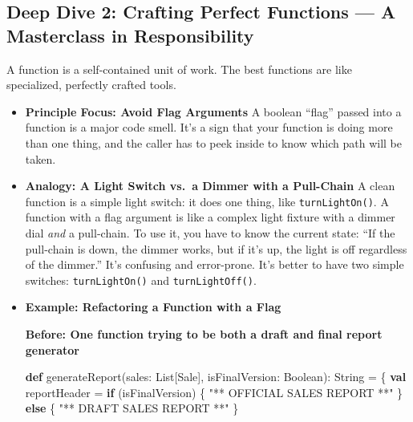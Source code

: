 \documentclass[
  letterpaper,
  DIV=11,
  numbers=noendperiod]{scrreprt}
\newenvironment{Shaded}{\begin{snugshade}}{\end{snugshade}}
\newcommand{\ControlFlowTok}[1]{\textcolor[rgb]{0.00,0.23,0.31}{\textbf{#1}}}
\newcommand{\ExtensionTok}[1]{\textcolor[rgb]{0.00,0.23,0.31}{#1}}
\newcommand{\FunctionTok}[1]{\textcolor[rgb]{0.28,0.35,0.67}{#1}}
\newcommand{\KeywordTok}[1]{\textcolor[rgb]{0.00,0.23,0.31}{\textbf{#1}}}
\newcommand{\NormalTok}[1]{\textcolor[rgb]{0.00,0.23,0.31}{#1}}
\newcommand{\OperatorTok}[1]{\textcolor[rgb]{0.37,0.37,0.37}{#1}}
\newcommand{\StringTok}[1]{\textcolor[rgb]{0.13,0.47,0.30}{#1}}
\begin{document}
\subsection{\texorpdfstring{\textbf{Deep Dive 2: Crafting Perfect
Functions --- A Masterclass in
Responsibility}}{Deep Dive 2: Crafting Perfect Functions --- A Masterclass in Responsibility}}\label{deep-dive-2-crafting-perfect-functions-a-masterclass-in-responsibility}

A function is a self-contained unit of work. The best functions are like
specialized, perfectly crafted tools.

\begin{itemize}
\item
  \textbf{Principle Focus: Avoid Flag Arguments} A boolean ``flag''
  passed into a function is a major code smell. It's a sign that your
  function is doing more than one thing, and the caller has to peek
  inside to know which path will be taken.
\item
  \textbf{Analogy: A Light Switch vs.~a Dimmer with a Pull-Chain} A
  clean function is a simple light switch: it does one thing, like
  \texttt{turnLightOn()}. A function with a flag argument is like a
  complex light fixture with a dimmer dial \emph{and} a pull-chain. To
  use it, you have to know the current state: ``If the pull-chain is
  down, the dimmer works, but if it's up, the light is off regardless of
  the dimmer.'' It's confusing and error-prone. It's better to have two
  simple switches: \texttt{turnLightOn()} and \texttt{turnLightOff()}.
\item
  \textbf{Example: Refactoring a Function with a Flag}

  \textbf{Before: One function trying to be both a draft and final
  report generator 🤢}

\begin{Shaded}
\begin{Highlighting}[]
\KeywordTok{def} \FunctionTok{generateReport}\OperatorTok{(}\NormalTok{sales}\OperatorTok{:} \ExtensionTok{List}\OperatorTok{[}\NormalTok{Sale}\OperatorTok{],}\NormalTok{ isFinalVersion}\OperatorTok{:} \ExtensionTok{Boolean}\OperatorTok{):} \ExtensionTok{String} \OperatorTok{=} \OperatorTok{\{}
  \KeywordTok{val}\NormalTok{ reportHeader }\OperatorTok{=} \ControlFlowTok{if} \OperatorTok{(}\NormalTok{isFinalVersion}\OperatorTok{)} \OperatorTok{\{}
    \StringTok{"** OFFICIAL SALES REPORT **"}
  \OperatorTok{\}} \ControlFlowTok{else} \OperatorTok{\{}
    \StringTok{"** DRAFT SALES REPORT **"}
  \OperatorTok{\}}


\end{Highlighting}
\end{Shaded}
\end{itemize}
\end{document}
